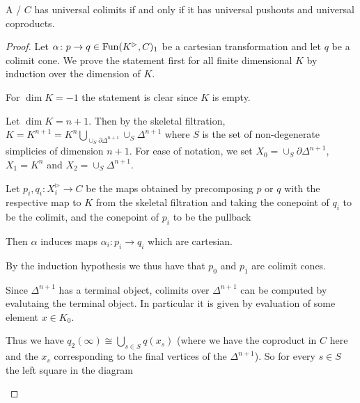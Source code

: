 \begin{lemma}
    A \inftycat/ $C$ has universal colimits if and only if it has universal pushouts and universal coproducts.
    \begin{proof}
        Let $\alpha\colon p\to q\in\operatorname{Fun}(K^{\rhd},C)_1$ be a cartesian transformation and let $q$ be a colimit cone. 
        We prove the statement first for all finite dimensional $K$ by induction over the dimension of $K$.

        For $\dim K=-1$ the statement is clear since $K$ is empty.
        
        Let $\dim K=n+1$. 
        Then by the skeletal filtration, $K=K^{n+1}=K^n\bigcup\limits_{\cup_S \partial\Delta^{n+1}}\cup_S \Delta^{n+1}$ where $S$ is the set of non-degenerate simplicies of dimension $n+1$.
        For ease of notation, we set $X_{0}=\cup_S \partial\Delta^{n+1}$, $X_1=K^n$ and $X_2=\cup_S \Delta^{n+1}$.

        Let $p_i,q_i\colon X_i^{\rhd}\to C$ be the maps obtained by precomposing $p$ or $q$ with the respective map to $K$ from the skeletal filtration and taking the conepoint of $q_i$ to be the colimit, and the conepoint of $p_i$ to be the pullback
        \begin{center}
        \end{center}
        Then $\alpha$ induces maps $\alpha_i\colon p_i\to q_i$ which are cartesian.

        By the induction hypothesis we thus have that $p_0$ and $p_1$ are colimit cones.

        Since $\Delta^{n+1}$ has a terminal object, colimits over $\Delta^{n+1}$ can be computed by evalutaing the terminal object.
        In particular it is given by evaluation of some element $x\in K_0$.

        Thus we have $q_2(\infty)\cong\bigcup\limits_{s\in S} q(x_s)$ (where we have the coproduct in $C$ here and the $x_s$ corresponding to the final vertices of the $\Delta^{n+1}$).
        So for every $s\in S$ the left square in the diagram
        \begin{center}
\end{center}
\end{proof}
\end{lemma}
